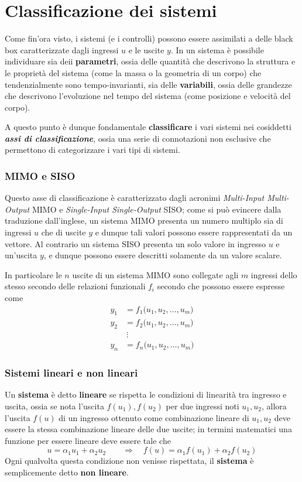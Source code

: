 \section{Classificazione dei sistemi}
	Come fin'ora visto, i sistemi (e i controlli) possono essere assimilati a delle black box caratterizzate dagli ingressi $u$ e le uscite $y$. In un sistema è possibile individuare sia deii \textbf{parametri}, ossia delle quantità che descrivono la struttura e le proprietà del sistema (come la massa o la geometria di un corpo) che tendenzialmente sono tempo-invarianti, sia delle \textbf{variabili}, ossia delle grandezze che descrivono l'evoluzione nel tempo del sistema (come posizione e velocità del corpo).
	
	A questo punto è dunque fondamentale \textbf{classificare} i vari sistemi nei cosiddetti \textit{\textbf{assi di classificazione}}, ossia una serie di connotazioni non esclusive che permettono di categorizzare i vari tipi di sistemi.
	
	\subsubsection{MIMO e SISO}
		Questo asse di classificazione è caratterizzato dagli acronimi \textit{Multi-Input Multi-Output} MIMO e \textit{Single-Input Single-Output} SISO; come si può evincere dalla traduzione dall'inglese, un sistema MIMO presenta un numero multiplo sia di ingressi $u$ che di uscite $y$ e dunque tali valori possono essere rappresentati da un vettore. Al contrario un sistema SISO presenta un solo valore in ingresso $u$ e un'uscita $y$, e dunque possono essere descritti solamente da un valore scalare.
		
		In particolare le $n$ uscite di un sistema MIMO sono collegate agli $m$ ingressi dello stesso secondo delle relazioni funzionali $f_i$ secondo che possono essere espresse come
		\begin{align*}
			y_1 & = f_1\big(u_1, u_2,\dots, u_m\big) \\
			y_2 & = f_2\big(u_1, u_2,\dots, u_m\big) \\
			& \ \vdots \\
			y_n & = f_n\big(u_1, u_2,\dots, u_m\big) 
		\end{align*}
	
	\subsubsection{Sistemi lineari e non lineari}
		Un \textbf{sistema} è detto \textbf{lineare} se rispetta le condizioni di linearità tra ingresso e uscita, ossia se nota l'uscita $f(u_1), f(u_2)$ per due ingressi noti $u_1,u_2$, allora l'uscita $f(u)$ di un ingresso ottenuto come combinazione lineare di $u_1,u_2$ deve essere la stessa combinazione lineare delle due uscite; in termini matematici una funzione per essere lineare deve essere tale che
		\[ u = \alpha_1 u_1 + \alpha_2 u_2 \qquad \Rightarrow \quad f(u) = \alpha_1 f(u_1) + \alpha_2 f(u_2) \]
    	Ogni qualvolta questa condizione non venisse rispettata, il \textbf{sistema} è semplicemente detto \textbf{non lineare}.
    
